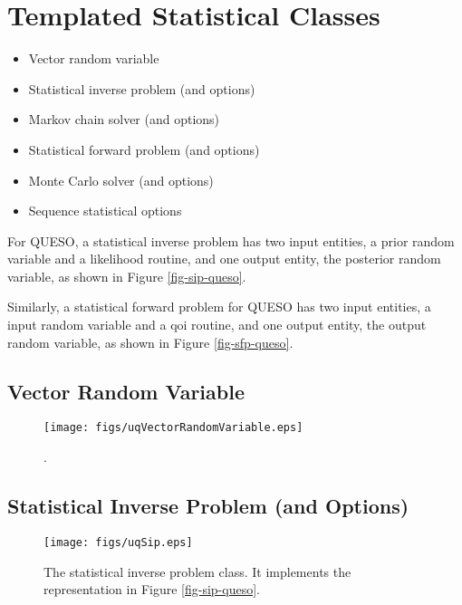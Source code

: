 \clearpage
\section{Templated Statistical Classes}

\begin{itemize}
\item Vector random variable
\item Statistical inverse problem (and options)
\item Markov chain solver (and options)
\item Statistical forward problem (and options)
\item Monte Carlo solver (and options)
\item Sequence statistical options
\end{itemize}

For QUESO, a statistical inverse problem has two input entities, a prior random variable and
a likelihood routine, and one output entity, the posterior random variable, as shown in Figure \ref{fig-sip-queso}.

Similarly, a statistical forward problem for QUESO has two input entities, a input random variable and
a qoi routine, and one output entity, the output random variable, as shown in Figure \ref{fig-sfp-queso}.

\clearpage
\subsection{Vector Random Variable}

\begin{figure}[h!]
\centerline{
\texttt{[image: figs/uqVectorRandomVariable.eps]}
}
\caption{
{\color{red}{The class diagram for the vector random variable class}}.
}
\label{fig-vector-rv-class}
\end{figure}

\clearpage
\subsection{Statistical Inverse Problem (and Options)}

\begin{figure}[h!]
\centerline{
\texttt{[image: figs/uqSip.eps]}
}
\caption{
The statistical inverse problem class. It implements the representation in Figure \ref{fig-sip-queso}.
}
\label{fig-sip-class}
\end{figure}

